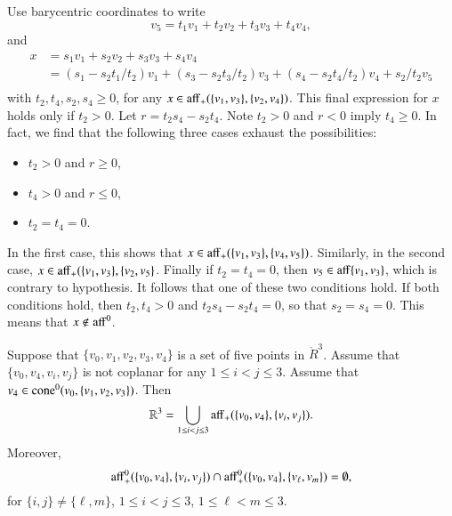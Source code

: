 \begin{tarskidata}
\begin{tarski}
\begin{proved}
Use barycentric coordinates to write
   $$
   v_5 = t_1 v_1 + t_2 v_2 + t_3 v_3 + t_4 v_4,
   $$
and 
    $$
    \begin{array}{lll}
    x &= s_1 v_1 + s_2 v_2 + s_3 v_3 + s_4 v_4 \\
      &= (s_1 - s_2 t_1/t_2) v_1 + (s_3 - s_2 t_3/t_2) v_3 +
        (s_4 - s_2 t_4/t_2) v_4 + s_2/t_2 v_5\\
    \end{array}
    $$
with $t_2,t_4,s_2,s_4\ge 0$,
for any $x\in{\operatorname{aff}}_+(\{v_1,v_3\},\{v_2,v_4\})$. 
This final expression for $x$ holds only if $t_2>0$. 
Let $r=t_2s_4-s_2t_4$.  
Note $t_2>0$ and $r<0$ imply $t_4\ge0$. In fact, we find that the following
three cases exhaust the possibilities:
\begin{itemize}
\item $t_2>0$ and $r\ge 0$,
\item $t_4>0$ and $r\le 0$,
\item $t_2=t_4=0$.
\end{itemize}
In the first case, this shows that 
$x\in{\operatorname{aff}}_+(\{v_1,v_3\},\{v_4,v_5\})$.
Similarly, in the second case,
$x\in{\operatorname{aff}}_+(\{v_1,v_3\},\{v_2,v_5\}$.
Finally if $t_2=t_4=0$, then $v_5\in{\operatorname{aff}}\{v_1,v_3\}$, which is
contrary to hypothesis.  It follows that one of these two
conditions hold.  If both conditions hold, then $t_2,t_4>0$
and $t_2 s_4 - s_2 t_4 =0$, so that $s_2=s_4 = 0$.  This means
that $x\not\in{\operatorname{aff}}^0$.
\swallowed\end{proved}
\end{tarski}





\begin{tarski}

\begin{lemma}
Suppose that $\{v_0,v_1,v_2,v_3,v_4\}$ is a set
of five points in $\ring{R}^3$.  Assume that $\{v_0,v_4,v_i,v_j\}$
is not coplanar for any $1\le i < j \le 3$.
Assume that $v_4\in{\operatorname{cone}}^0(v_0,\{v_1,v_2,v_3\})$.
Then 
   $$
   \mathbb{R}^3 = \bigcup_{1\le i<j\le 3}
    {\operatorname{aff}}_+(\{v_0,v_4\},\{v_i,v_j\}).
   $$
Moreover,
   $$
   {\operatorname{aff}}_+^0(\{v_0,v_4\},\{v_i,v_j\}) \cap
   {\operatorname{aff}}_+^0(\{v_0,v_4\},\{v_\ell,v_m\}) =\emptyset,
   $$
for $\{i,j\}\ne \{\ell,m\}$, $1\le i<j\le 3$, $1\le \ell<m\le 3$.
\end{lemma}


\end{tarski}
\end{tarskidata}
